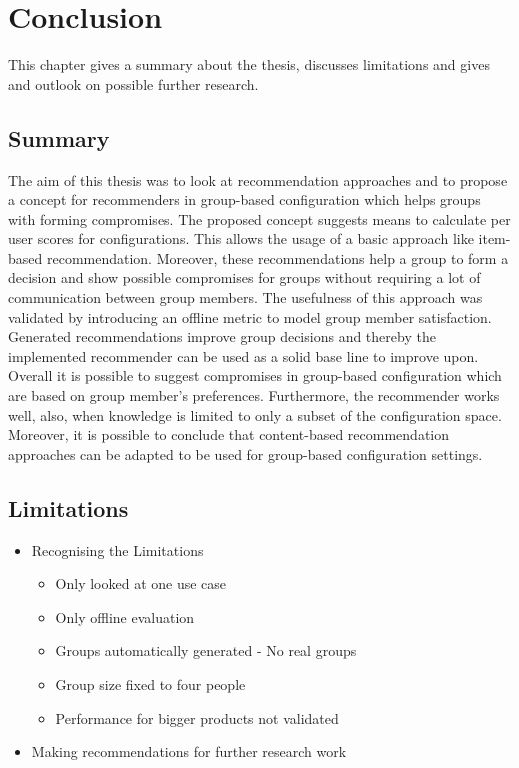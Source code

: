 \chapter{Conclusion}
\label{ch:Conclusion}

This chapter gives a summary about the thesis, discusses limitations and gives and outlook on possible further research.


\section{Summary}
\label{sec:Conclusion:Summary}

The aim of this thesis was to look at recommendation approaches and to propose a concept for recommenders in group-based configuration which helps groups with forming compromises. The proposed concept suggests means to calculate per user scores for configurations. This allows the usage of a basic approach like item-based recommendation. Moreover, these recommendations help a group to form a decision and show possible compromises for groups without requiring a lot of communication between group members. The usefulness of this approach was validated by introducing an offline metric to model group member satisfaction. Generated recommendations improve group decisions and thereby the implemented recommender can be used as a solid base line to improve upon. 
Overall it is possible to suggest compromises in group-based configuration which are based on group member's preferences. Furthermore, the recommender works well, also, when knowledge is limited to only a subset of the configuration space. Moreover, it is possible to conclude that content-based recommendation approaches can be adapted to be used for group-based configuration settings.

\section{Limitations}
\label{sec:Conclusion:Limitations}
\begin{itemize}
    \item Recognising the Limitations
        \begin{itemize}
            \item Only looked at one use case
            \item Only offline evaluation
            \item Groups automatically generated - No real groups
            \item Group size fixed to four people
            \item Performance for bigger products not validated
        \end{itemize}
    \item Making recommendations for further research work 
\end{itemize}

